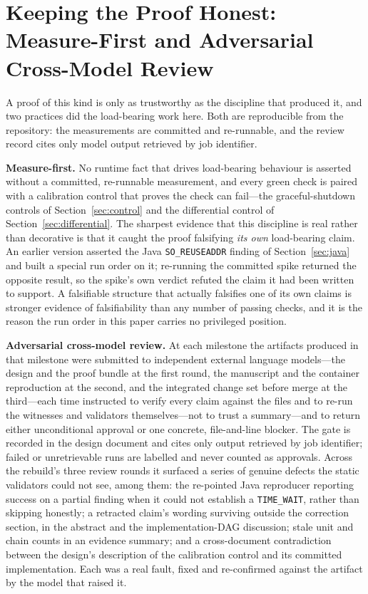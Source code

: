 \documentclass[11pt,letterpaper]{article}
\begin{document}
\section{Keeping the Proof Honest: Measure-First and Adversarial Cross-Model Review}
\label{sec:honest}

A proof of this kind is only as trustworthy as the discipline that produced it,
and two practices did the load-bearing work here. Both are reproducible from the
repository: the measurements are committed and re-runnable, and the review record
cites only model output retrieved by job identifier.

\textbf{Measure-first.} No runtime fact that drives load-bearing behaviour is
asserted without a committed, re-runnable measurement, and every green check is
paired with a calibration control that proves the check can fail---the
graceful-shutdown controls of Section~\ref{sec:control} and the differential
control of Section~\ref{sec:differential}. The sharpest evidence that this
discipline is real rather than decorative is that it caught the proof falsifying
\emph{its own} load-bearing claim. An earlier version asserted the Java
\texttt{SO\_REUSEADDR} finding of Section~\ref{sec:java} and built a special run
order on it; re-running the committed spike returned the opposite result, so the
spike's own verdict refuted the claim it had been written to support. A
falsifiable structure that actually falsifies one of its own claims is stronger
evidence of falsifiability than any number of passing checks, and it is the reason
the run order in this paper carries no privileged position.

\textbf{Adversarial cross-model review.} At each milestone the artifacts produced
in that milestone were submitted to independent external language models---the
design and the proof bundle at the first round, the manuscript and the container
reproduction at the second, and the integrated change set before merge at the
third---each time instructed to verify every claim against the files and to re-run
the witnesses and validators themselves---not to trust a summary---and to return
either unconditional approval or one concrete, file-and-line blocker. The gate is
recorded in the design document and cites only output retrieved by job identifier;
failed or unretrievable runs are labelled and never counted as approvals. Across
the rebuild's three review rounds it surfaced a series of genuine defects the
static validators could not see, among them: the re-pointed Java reproducer
reporting success on a partial finding when it could not establish a
\texttt{TIME\_WAIT}, rather than skipping honestly; a retracted claim's wording
surviving outside the correction section, in the abstract and the
implementation-DAG discussion; stale unit and chain counts in an evidence summary;
and a cross-document contradiction between the design's description of the
calibration control and its committed implementation. Each was a real fault, fixed
and re-confirmed against the artifact by the model that raised it.
\end{document}
